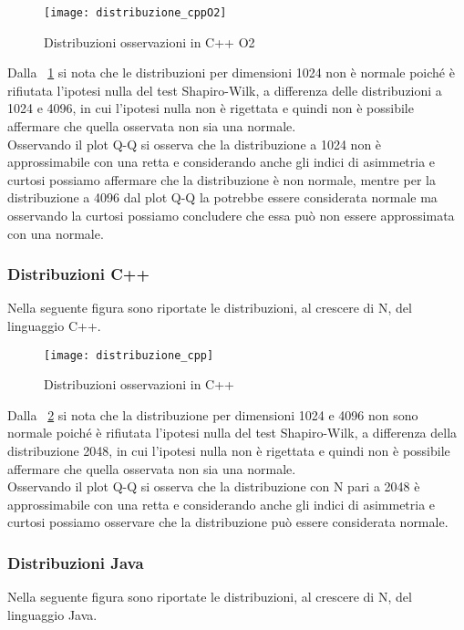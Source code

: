 \begin{figure}[!htbp]
  \texttt{[image: distribuzione\_cppO2]}
  \caption{Distribuzioni osservazioni in C++ O2}
  \label{distribuzione_cppO2}
\end{figure}
Dalla \figurename~\ref{distribuzione_cppO2} si nota
che le distribuzioni per dimensioni 1024 non è normale poiché è rifiutata
l'ipotesi nulla del test Shapiro-Wilk, a differenza delle distribuzioni a 1024 e 4096,
in cui l'ipotesi nulla non è rigettata e quindi non è possibile affermare che
quella osservata non sia una normale.\\
Osservando il plot Q-Q si osserva che la distribuzione a 1024 non è approssimabile con una
retta e considerando anche gli indici di asimmetria e curtosi possiamo affermare che
la distribuzione è non normale, mentre per la distribuzione a 4096 dal plot Q-Q la potrebbe
essere considerata normale ma osservando la curtosi possiamo concludere che essa può
non essere approssimata con una normale.
\clearpage
\subsubsection{Distribuzioni C++ }
Nella seguente figura sono riportate le distribuzioni, al crescere di N, del
linguaggio C++.

\begin{figure}[!htbp]
  \texttt{[image: distribuzione\_cpp]}
  \caption{Distribuzioni osservazioni in C++}
  \label{distribuzione_cpp}
\end{figure}

Dalla \figurename~\ref{distribuzione_cpp} si nota
che la distribuzione per dimensioni 1024 e 4096 non sono normale poiché è rifiutata
l'ipotesi nulla del test Shapiro-Wilk, a differenza della distribuzione 2048,
in cui l'ipotesi nulla non è rigettata e quindi non è possibile affermare
che quella osservata non sia una normale.\\
Osservando il plot Q-Q si osserva che la distribuzione con N pari a 2048 è approssimabile con una
retta e considerando anche gli indici di asimmetria e curtosi possiamo osservare che
la distribuzione può essere considerata normale.\\
\clearpage
\subsubsection{Distribuzioni Java}
Nella seguente figura sono riportate le distribuzioni, al crescere di N, del
linguaggio Java.

